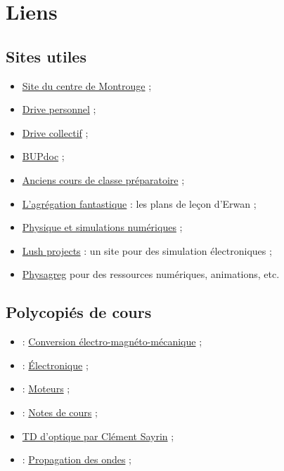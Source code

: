 \chapter*{Liens}

\section*{Sites utiles}

\begin{itemize}
\item \href{http://ressources.agreg.phys.ens.fr/index}{Site du centre de Montrouge} ;
\item \href{https://drive.google.com/drive/folders/1k25PmoJLoWdJqkvU63OvsjhtP5SWEFPo?usp=sharing}{Drive personnel} ;
\item \href{https://drive.google.com/drive/folders/1Xz8t7SrdGd-0hLLhcAqeeyTuv98uMSQ1?usp=sharing}{Drive collectif} ;
\item \href{http://bupdoc.udppc.asso.fr/consultation/selections.php}{BUPdoc} ;
\item \href{http://www.joelsornette.fr/}{Anciens cours de classe préparatoire} ;
\item \href {https://studylibfr.com/doc/2383850/l-agr\%C3\%A9gation-fantastique}{L'agrégation fantastique} : les plans de leçon d'Erwan ;
\item \href{http://ressources.univ-lemans.fr/AccesLibre/UM/Pedago/physique/02/}{Physique et simulations numériques} ;
\item \href{https://lushprojects.com/circuitjs/}{Lush projects} : un site pour des simulation électroniques ;
\item \href{http://www.physagreg.fr/animations.php}{Physagreg} pour des ressources numériques, animations, etc.
\end{itemize}

\section*{Polycopiés de cours}

\begin{itemize}
\item \cite{Naval} : \href{https://lnspe2.fr/Cours_Phys/CP02.pdf}{Conversion électro-magnéto-mécanique} ;
\item \cite{Neveu2019a} : \href{https://gitlab.in2p3.fr/Jeremy/Electronique}{Électronique} ;
\item \cite{Neveu2019} : \href{https://gitlab.in2p3.fr/Jeremy/Moteurs}{Moteurs} ;
\item \cite{Rabaud2019} : \href{http://www.fast.u-psud.fr/~rabaud/}{Notes de cours} ;
\item \href{http://www.lkb.upmc.fr/cqed/teaching/teachingsayrin/}{TD d'optique par Clément Sayrin} ;
\item \cite{Thibierge2014} : \href{https://www.etienne-thibierge.fr/agreg/ondes_poly_2015.pdf}{Propagation des ondes} ;
\end{itemize}


